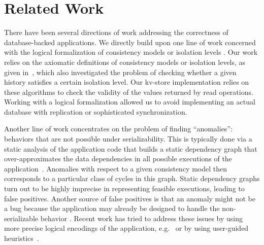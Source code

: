 
\section{Related Work}
\label{sec:app:related}


There have been several directions of work addressing the correctness of database-backed applications. 
We directly build upon one line of work concerned with the logical formalization
of consistency models or isolation levels 
\cite{ansi,DBLP:conf/icde/AdyaLO00,DBLP:conf/sigmod/BerensonBGMOO95,DBLP:conf/concur/Cerone0G15,DBLP:journals/pacmpl/BiswasE19}.
Our work relies on the axiomatic definitions of consistency models or isolation levels, as given
in~\cite{DBLP:journals/pacmpl/BiswasE19}, which also investigated
the problem of checking whether a given history satisfies a certain isolation
level. Our kv-store implementation relies on these algorithms 
to check the validity of the values returned by read operations. Working with a
logical formalization allowed us to avoid implementing an actual database with replication or
sophisticated synchronization.

Another line of work concentrates on the problem of finding ``anomalies'': 
behaviors that are not possible under serializability. This is typically done
via a static analysis of the application code that builds a static dependency graph that
over-approximates the data dependencies in all possible
executions of the application~\cite{DBLP:journals/jacm/CeroneG18,DBLP:journals/jacm/CeroneG18,DBLP:conf/concur/0002G16,DBLP:journals/tods/FeketeLOOS05,DBLP:conf/vldb/JorwekarFRS07,DBLP:conf/sigmod/WarszawskiB17,DBLP:journals/pvldb/GanRRB020}.
Anomalies with respect to a given consistency model then corresponds to a
particular class of cycles in this graph. Static dependency graphs turn out to
be highly imprecise in representing feasible executions, leading to false
positives. Another source of false positives is that an anomaly might not be a
bug because the application may already be designed to handle the
non-serializable behavior \cite{DBLP:conf/pldi/BrutschyD0V18,DBLP:journals/pvldb/GanRRB020}. 
Recent work has tried to address these issues by using more precise 
logical encodings of the application,
e.g.~\cite{DBLP:conf/popl/BrutschyD0V17,DBLP:conf/pldi/BrutschyD0V18} or
by using user-guided heuristics~\cite{DBLP:journals/pvldb/GanRRB020}. 

